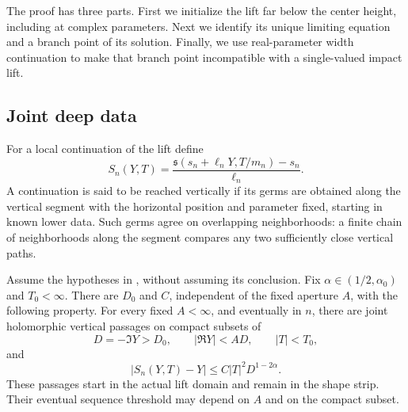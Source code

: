 The proof has three parts. First we initialize the lift far below the
center height, including at complex parameters. Next we identify its
unique limiting equation and a branch point of its solution. Finally,
we use real-parameter width continuation to make that branch point
incompatible with a single-valued impact lift.

\subsection{Joint deep data}

For a local continuation of the lift define
\[
 S_n(Y,T)=\frac{\mathfrak s(s_n+\ell_nY,T/m_n)-s_n}{\ell_n}.
\]
A continuation is said to be reached vertically if its germs are
obtained along the vertical segment with the horizontal position and
parameter fixed, starting in known lower data. Such germs agree on
overlapping neighborhoods: a finite chain of neighborhoods along the
segment compares any two sufficiently close vertical paths.

\begin{lemma}
\label{profile:deep-data}
Assume the hypotheses in , without
assuming its conclusion. Fix \(\alpha\in(1/2,\alpha_0)\) and
\(T_0<\infty\). There are \(D_0\) and \(C\), independent of the
fixed aperture \(A\), with the following property. For every fixed
\(A<\infty\), and eventually in \(n\), there are joint holomorphic
vertical passages on compact subsets of
\begin{equation}
 \label{profile:deep-domain}
 D=-\Im Y>D_0,\qquad |\Re Y|<AD,\qquad |T|<T_0,
\end{equation}
and
\begin{equation}
 \label{profile:deep-estimate}
 |S_n(Y,T)-Y|\le C|T|^2D^{1-2\alpha}.
\end{equation}
These passages start in the actual lift domain and remain in the shape
strip. Their eventual sequence threshold may depend on \(A\) and on
the compact subset.
\end{lemma}

